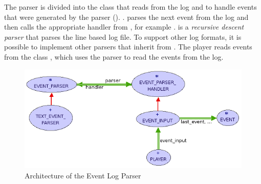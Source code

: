 The parser is divided into the class  that reads from the log and  to handle events that were generated by the parser (). \hspace{0pt}. parses the next event from the log and then calls the appropriate handler from , for example .  
 is a \emph{recursive descent parser} \cite{aho86} that parses the line based log file. To support other log formats, it is possible to implement other parsers that inherit from .
The player reads events from the class , which uses the parser to read the events from the log.

\begin{figure}[ht]
  \centering
  \includegraphics[width=1\textwidth]{illustrations/implementation_parser.png}
  \caption{Architecture of the Event Log Parser}
  \label{fig:implementation_parser}
\end{figure}


